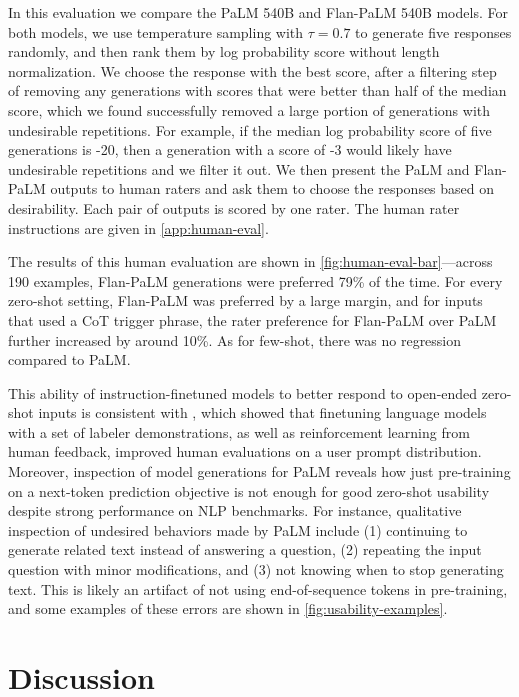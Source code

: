 In this evaluation we compare the PaLM 540B and Flan-PaLM 540B models. For both models, we use temperature sampling with $\tau=0.7$ to generate five responses randomly, and then rank them by log probability score without length normalization. We choose the response with the best score, after a filtering step of removing any generations with scores that were better than half of the median score, which we found successfully removed a large portion of generations with undesirable repetitions. For example, if the median log probability score of five generations is -20, then a generation with a score of -3 would likely have undesirable repetitions and we filter it out. We then present the PaLM and Flan-PaLM outputs to human raters and ask them to choose the responses based on desirability. Each pair of outputs is scored by one rater. The human rater instructions are given in \ref{app:human-eval}.

The results of this human evaluation are shown in \ref{fig:human-eval-bar}---across 190 examples, Flan-PaLM generations were preferred 79\% of the time. For every zero-shot setting, Flan-PaLM was preferred by a large margin, and for inputs that used a CoT trigger phrase, the rater preference for Flan-PaLM over PaLM further increased by around 10\%.
As for few-shot, there was no regression compared to PaLM.

This ability of instruction-finetuned models to better respond to open-ended zero-shot inputs is consistent with \citet{ouyang2022training}, which showed that finetuning language models with a set of labeler demonstrations, as well as reinforcement learning from human feedback, improved human evaluations on a user prompt distribution. Moreover, inspection of model generations for PaLM reveals how just pre-training on a next-token prediction objective is not enough for good zero-shot usability despite strong performance on NLP benchmarks. For instance, qualitative inspection of undesired behaviors made by PaLM include (1) continuing to generate related text instead of answering a question, (2) repeating the input question with minor modifications, and (3) not knowing when to stop generating text. This is likely an artifact of not using end-of-sequence tokens in pre-training, and some examples of these errors are shown in \ref{fig:usability-examples}.

\section{Discussion}

